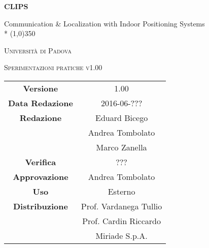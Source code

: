 \documentclass[a4paper,12pt]{article}
\author{}
\date{9/12/2015}
\begin{document}
	\begin{titlepage}
		\centering
		{\huge\bfseries CLIPS\par}
	Communication \& Localization with Indoor Positioning Systems \\*
	\line(1,0){350} \\
	{\scshape\LARGE Università di Padova \par}
	\vspace{1cm}
	{\scshape\Large Sperimentazioni pratiche v1.00\par}
	\logo
	\newpage
		\begin{tabular}{c|c}
			{\hfill \textbf{Versione}} 		& 1.00				\\
			{\hfill\textbf{Data Redazione}} 	& 2016-06-???	  		\\
			{\hfill\textbf{Redazione}}		& Eduard Bicego \\
											& Andrea Tombolato  \\
											& Marco Zanella		\\
			{\hfill\textbf{Verifica}} 		& ???		\\
			{\hfill\textbf{Approvazione}} 		& Andrea Tombolato		\\
			{\hfill\textbf{Uso}} 			& Esterno			\\
			{\hfill\textbf{Distribuzione}} 		& Prof. Vardanega Tullio 	\\
								& Prof. Cardin Riccardo 	\\
								& Miriade S.p.A. 		\\
		\end{tabular}
	\end{titlepage}
	\newpage
		\pagestyle{myfront}
		

	\newpage
		\tableofcontents
	\newpage
		\listoftables
	\newpage
		\listoffigures
	\label{LastFrontPage}

	\newpage
	\pagestyle{mymain}
				
		
	\newpage
		
		
	\newpage
		
		
	\newpage
		
	\newpage
		
		
	
	\newpage
		
		
	\newpage
		
		
	\label{LastPage}
\end{document}
